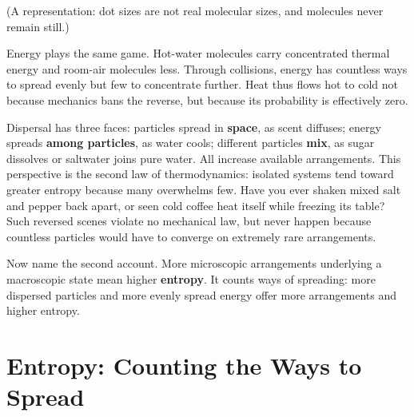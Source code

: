 \begin{center}
\end{center}

(A representation: dot sizes are not real molecular sizes, and molecules never remain still.)

Energy plays the same game. Hot-water molecules carry concentrated thermal energy and room-air molecules less. Through collisions, energy has countless ways to spread evenly but few to concentrate further. Heat thus flows hot to cold not because mechanics bans the reverse, but because its probability is effectively zero.

Dispersal has three faces: particles spread in \textbf{space}, as scent diffuses; energy spreads \textbf{among particles}, as water cools; different particles \textbf{mix}, as sugar dissolves or saltwater joins pure water. All increase available arrangements. This perspective is the second law of thermodynamics: isolated systems tend toward greater entropy because many overwhelms few. Have you ever shaken mixed salt and pepper back apart, or seen cold coffee heat itself while freezing its table? Such reversed scenes violate no mechanical law, but never happen because countless particles would have to converge on extremely rare arrangements.

Now name the second account. More microscopic arrangements underlying a macroscopic state mean higher \textbf{entropy}. It counts ways of spreading: more dispersed particles and more evenly spread energy offer more arrangements and higher entropy.

\section{Entropy: Counting the Ways to Spread}

